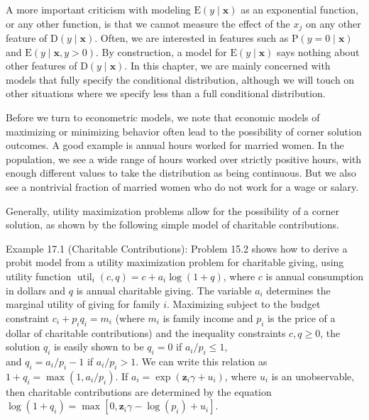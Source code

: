 \documentclass[10pt]{article}
\begin{document}
A more important criticism with modeling $\mathrm{E}(y \mid \mathbf{x})$ as an exponential function, or any other function, is that we cannot measure the effect of the $x_{j}$ on any other feature of $\mathrm{D}(y \mid \mathbf{x})$. Often, we are interested in features such as $\mathrm{P}(y=0 \mid \mathbf{x})$ and $\mathrm{E}(y \mid \mathbf{x}, y>0)$. By construction, a model for $\mathrm{E}(y \mid \mathbf{x})$ says nothing about other features of $\mathrm{D}(y \mid \mathbf{x})$. In this chapter, we are mainly concerned with models that fully specify the conditional distribution, although we will touch on other situations where we specify less than a full conditional distribution.

Before we turn to econometric models, we note that economic models of maximizing or minimizing behavior often lead to the possibility of corner solution outcomes. A good example is annual hours worked for married women. In the population, we see a wide range of hours worked over strictly positive hours, with enough different values to take the distribution as being continuous. But we also see a nontrivial fraction of married women who do not work for a wage or salary.

Generally, utility maximization problems allow for the possibility of a corner solution, as shown by the following simple model of charitable contributions.

Example 17.1 (Charitable Contributions): Problem 15.2 shows how to derive a probit model from a utility maximization problem for charitable giving, using utility function $\operatorname{util}_{i}(c, q)=c+a_{i} \log (1+q)$, where $c$ is annual consumption in dollars and $q$ is annual charitable giving. The variable $a_{i}$ determines the marginal utility of giving for family $i$. Maximizing subject to the budget constraint $c_{i}+p_{i} q_{i}=m_{i}$ (where $m_{i}$ is family income and $p_{i}$ is the price of a dollar of charitable contributions) and the inequality constraints $c, q \geq 0$, the solution $q_{i}$ is easily shown to be $q_{i}=0$ if $a_{i} / p_{i} \leq 1$,\\
and $q_{i}=a_{i} / p_{i}-1$ if $a_{i} / p_{i}>1$. We can write this relation as $1+q_{i}=\max \left(1, a_{i} / p_{i}\right)$. If $a_{i}=\exp \left(\mathbf{z}_{i} \gamma+u_{i}\right)$, where $u_{i}$ is an unobservable, then charitable contributions are determined by the equation\\
$\log \left(1+q_{i}\right)=\max \left[0, \mathbf{z}_{i} \gamma-\log \left(p_{i}\right)+u_{i}\right]$.
\end{document}
